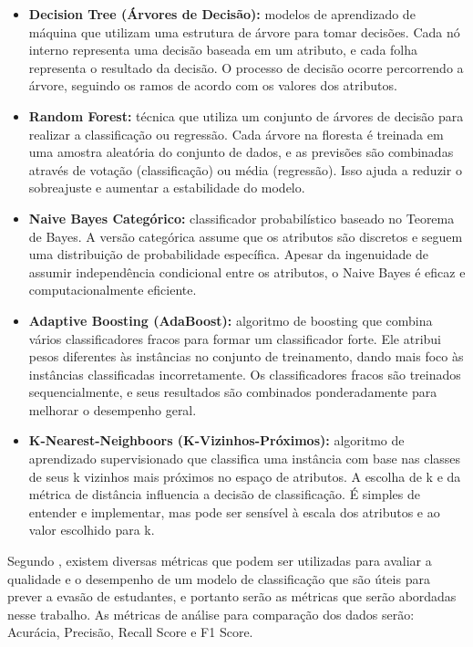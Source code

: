 \begin{itemize}
    \item \textbf{Decision Tree (Árvores de Decisão):} modelos de aprendizado de máquina que utilizam uma estrutura de árvore para tomar decisões. Cada nó interno representa uma decisão baseada em um atributo, e cada folha representa o resultado da decisão. O processo de decisão ocorre percorrendo a árvore, seguindo os ramos de acordo com os valores dos atributos.
    \item \textbf{Random Forest:} técnica que utiliza um conjunto de árvores de decisão para realizar a classificação ou regressão. Cada árvore na floresta é treinada em uma amostra aleatória do conjunto de dados, e as previsões são combinadas através de votação (classificação) ou média (regressão). Isso ajuda a reduzir o sobreajuste e aumentar a estabilidade do modelo.
    \item \textbf{Naive Bayes Categórico:} classificador probabilístico baseado no Teorema de Bayes. A versão categórica assume que os atributos são discretos e seguem uma distribuição de probabilidade específica. Apesar da ingenuidade de assumir independência condicional entre os atributos, o Naive Bayes é eficaz e computacionalmente eficiente.
    \item \textbf{Adaptive Boosting (AdaBoost):} algoritmo de boosting que combina vários classificadores fracos para formar um classificador forte. Ele atribui pesos diferentes às instâncias no conjunto de treinamento, dando mais foco às instâncias classificadas incorretamente. Os classificadores fracos são treinados sequencialmente, e seus resultados são combinados ponderadamente para melhorar o desempenho geral.
    \item \textbf{K-Nearest-Neighboors (K-Vizinhos-Próximos):} algoritmo de aprendizado supervisionado que classifica uma instância com base nas classes de seus k vizinhos mais próximos no espaço de atributos. A escolha de k e da métrica de distância influencia a decisão de classificação. É simples de entender e implementar, mas pode ser sensível à escala dos atributos e ao valor escolhido para k.
\end{itemize}

Segundo , existem diversas métricas que podem ser utilizadas para avaliar a qualidade e o desempenho de um modelo de classificação que são úteis para prever a evasão de estudantes, e portanto serão as métricas que serão abordadas nesse trabalho. As métricas de análise para comparação dos dados serão: Acurácia, Precisão, Recall Score e F1 Score.


